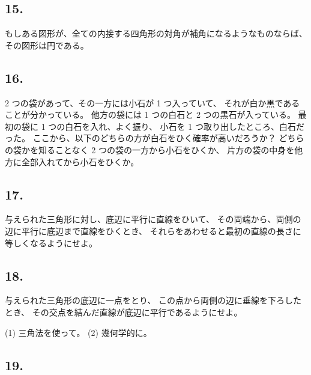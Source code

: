 \subsection*{15.}

もしある図形が、全ての内接する四角形の対角が補角になるようなものならば、
その図形は円である。
\begin{flushright}
[3/91]
\end{flushright}

\subsection*{16.}

  2 つの袋があって、その一方には小石が 1 つ入っていて、
それが白か黒であることが分かっている。
他方の袋には 1 つの白石と 2 つの黒石が入っている。
最初の袋に 1 つの白石を入れ、よく振り、
小石を 1 つ取り出したところ、白石だった。
ここから、以下のどちらの方が白石をひく確率が高いだろうか？
どちらの袋かを知ることなく 2 つの袋の一方から小石をひくか、
片方の袋の中身を他方に全部入れてから小石をひくか。
\begin{flushright}
[10/87]
\end{flushright}

\subsection*{17.}

与えられた三角形に対し、底辺に平行に直線をひいて、
その両端から、両側の辺に平行に底辺まで直線をひくとき、
それらをあわせると最初の直線の長さに等しくなるようにせよ。
\begin{flushright}
[3/89]
\end{flushright}

\subsection*{18.}

与えられた三角形の底辺に一点をとり、
この点から両側の辺に垂線を下ろしたとき、
その交点を結んだ直線が底辺に平行であるようにせよ。

(1) 三角法を使って。
(2) 幾何学的に。

\begin{flushright}
[11/89]
\end{flushright}

\subsection*{19.}

